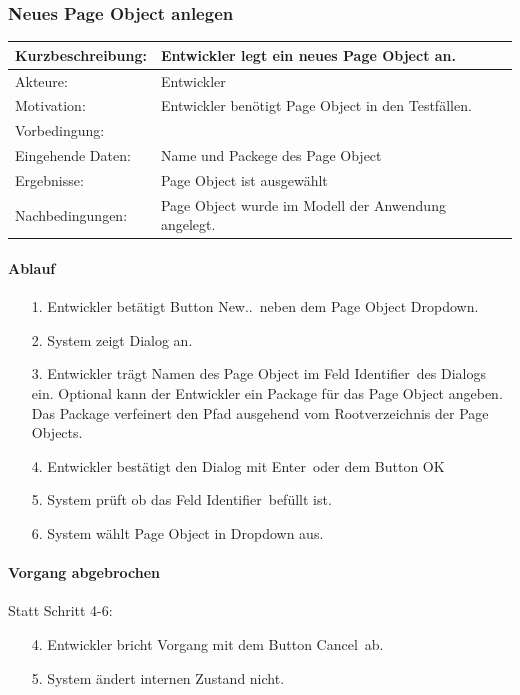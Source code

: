 \subsubsection{Neues Page Object anlegen}
\label{sec:neues_page_object_anlegen}

\begin{tabular}[h]{|p{4cm}|p{}|}
\hline 
\rule[-1ex]{0pt}{2.5ex}Kurzbeschreibung: & 
Entwickler legt ein neues Page Object an. \\  
\hline 
\rule[-1ex]{0pt}{2.5ex}Akteure: & 
Entwickler \\ 
\hline 
\rule[-1ex]{0pt}{2.5ex}Motivation: & 
Entwickler benötigt Page Object in den Testfällen. \\ 
\hline 
\rule[-1ex]{0pt}{2.5ex}Vorbedingung: &  \\ 
\hline 
\rule[-1ex]{0pt}{2.5ex}Eingehende Daten: & Name und Packege des Page Object \\ 
\hline 
\rule[-1ex]{0pt}{2.5ex}Ergebnisse: & Page Object ist ausgewählt \\ 
\hline 
\rule[-1ex]{0pt}{2.5ex}Nachbedingungen: & Page Object wurde im Modell der Anwendung angelegt.  \\ 
\hline 
\end{tabular} 

\paragraph{Ablauf}

\begin{itemize}[itemsep=0pt]
\item[1.] Entwickler betätigt Button \grq New..\grq\ neben dem Page Object Dropdown. 
\item[2.] System zeigt Dialog an. 
\item[3.] Entwickler trägt Namen des Page Object im Feld \grq Identifier\grq\ des Dialogs ein. Optional kann der Entwickler ein Package für das Page Object angeben. Das Package verfeinert den Pfad ausgehend vom Rootverzeichnis der Page Objects.
\item[4.] Entwickler bestätigt den Dialog mit \grq Enter\grq\ oder dem Button \grq OK\grq\
\item[5.] System prüft ob das Feld \grq Identifier\grq\ befüllt ist.
\item[6.] System wählt Page Object in Dropdown aus.
\end{itemize}

\paragraph{Vorgang abgebrochen}
Statt Schritt 4-6:
\begin{itemize}[itemsep=0pt]
\item[4.] Entwickler bricht Vorgang mit dem Button \grq Cancel\grq\ ab. 
\item[5.] System ändert internen Zustand nicht. 
\end{itemize}

